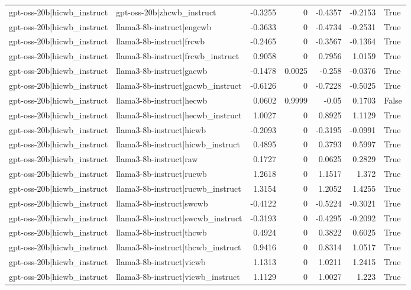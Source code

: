 \begin{table}
\begin{tabular}{l l r r r r l}
gpt-oss-20b|hicwb_instruct & gpt-oss-20b|zhcwb_instruct & -0.3255 & 0 & -0.4357 & -0.2153 & True \\
gpt-oss-20b|hicwb_instruct & llama3-8b-instruct|engcwb & -0.3633 & 0 & -0.4734 & -0.2531 & True \\
gpt-oss-20b|hicwb_instruct & llama3-8b-instruct|frcwb & -0.2465 & 0 & -0.3567 & -0.1364 & True \\
gpt-oss-20b|hicwb_instruct & llama3-8b-instruct|frcwb_instruct & 0.9058 & 0 & 0.7956 & 1.0159 & True \\
gpt-oss-20b|hicwb_instruct & llama3-8b-instruct|gacwb & -0.1478 & 0.0025 & -0.258 & -0.0376 & True \\
gpt-oss-20b|hicwb_instruct & llama3-8b-instruct|gacwb_instruct & -0.6126 & 0 & -0.7228 & -0.5025 & True \\
gpt-oss-20b|hicwb_instruct & llama3-8b-instruct|hecwb & 0.0602 & 0.9999 & -0.05 & 0.1703 & False \\
gpt-oss-20b|hicwb_instruct & llama3-8b-instruct|hecwb_instruct & 1.0027 & 0 & 0.8925 & 1.1129 & True \\
gpt-oss-20b|hicwb_instruct & llama3-8b-instruct|hicwb & -0.2093 & 0 & -0.3195 & -0.0991 & True \\
gpt-oss-20b|hicwb_instruct & llama3-8b-instruct|hicwb_instruct & 0.4895 & 0 & 0.3793 & 0.5997 & True \\
gpt-oss-20b|hicwb_instruct & llama3-8b-instruct|raw & 0.1727 & 0 & 0.0625 & 0.2829 & True \\
gpt-oss-20b|hicwb_instruct & llama3-8b-instruct|rucwb & 1.2618 & 0 & 1.1517 & 1.372 & True \\
gpt-oss-20b|hicwb_instruct & llama3-8b-instruct|rucwb_instruct & 1.3154 & 0 & 1.2052 & 1.4255 & True \\
gpt-oss-20b|hicwb_instruct & llama3-8b-instruct|swcwb & -0.4122 & 0 & -0.5224 & -0.3021 & True \\
gpt-oss-20b|hicwb_instruct & llama3-8b-instruct|swcwb_instruct & -0.3193 & 0 & -0.4295 & -0.2092 & True \\
gpt-oss-20b|hicwb_instruct & llama3-8b-instruct|thcwb & 0.4924 & 0 & 0.3822 & 0.6025 & True \\
gpt-oss-20b|hicwb_instruct & llama3-8b-instruct|thcwb_instruct & 0.9416 & 0 & 0.8314 & 1.0517 & True \\
gpt-oss-20b|hicwb_instruct & llama3-8b-instruct|vicwb & 1.1313 & 0 & 1.0211 & 1.2415 & True \\
gpt-oss-20b|hicwb_instruct & llama3-8b-instruct|vicwb_instruct & 1.1129 & 0 & 1.0027 & 1.223 & True \\

\end{tabular}
\end{table}
